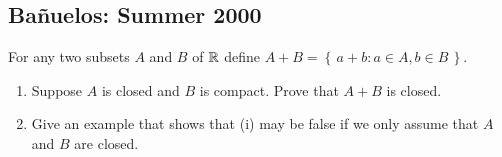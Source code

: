 \subsection{Bañuelos: Summer 2000}
\setcounter{exercise}{0}
\setcounter{equation}{0}

\begin{problem}
  For any two subsets $A$ and $B$ of $\mathbb{R}$ define $A+B=\left\{\,a+b:a\in
    A,b\in B\,\right\}$.
  \begin{enumerate}[label=(\roman*),noitemsep]
  \item Suppose $A$ is closed and $B$ is compact. Prove that $A+B$ is
    closed.
  \item Give an example that shows that (i) may be false if we only assume
    that $A$ and $B$ are closed.
  \end{enumerate}
\end{problem}
